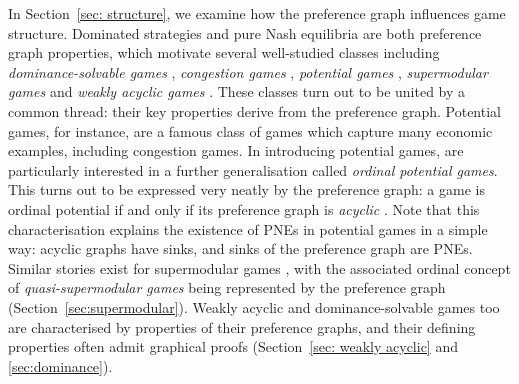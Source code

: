 \documentclass[preprint,authoryear]{elsarticle}
\begin{document}
In Section~\ref{sec: structure}, we examine how the preference graph influences game structure. Dominated strategies and pure Nash equilibria are both preference graph properties, which motivate several well-studied classes including \emph{dominance-solvable games} \citep{moulin_dominance_1984}, \emph{congestion games} \citep{rosenthal_class_1973}, \emph{potential games} \citep{monderer_potential_1996}, \emph{supermodular games} \citep{topkis1979equilibrium} and \emph{weakly acyclic games} \citep{young_evolution_1993}. These classes turn out to be united by a common thread: their key properties derive from the preference graph. Potential games, for instance, are a famous class of games which capture many economic examples, including congestion games. In introducing potential games, \cite{monderer_potential_1996} are particularly interested in a further generalisation called \emph{ordinal potential games}. This turns out to be expressed very neatly by the preference graph: a game is ordinal potential if and only if its preference graph is \emph{acyclic} \citep{biggar_graph_2023}. Note that this characterisation explains the existence of PNEs in potential games in a simple way: acyclic graphs have sinks, and sinks of the preference graph are PNEs. Similar stories exist for supermodular games \citep{milgrom_rationalizability_1990}, with the associated ordinal concept of \emph{quasi-supermodular games} being represented by the preference graph (Section~\ref{sec:supermodular}). Weakly acyclic and dominance-solvable games too are characterised by properties of their preference graphs, and their defining properties often admit graphical proofs (Section~\ref{sec: weakly acyclic} and \ref{sec:dominance}).
\end{document}
